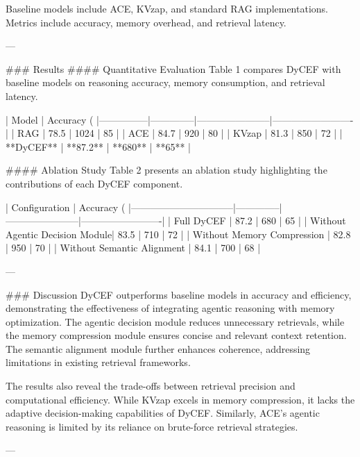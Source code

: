 Baseline models include ACE, KVzap, and standard RAG implementations. Metrics include accuracy, memory overhead, and retrieval latency.

---

### Results
#### Quantitative Evaluation
Table 1 compares DyCEF with baseline models on reasoning accuracy, memory consumption, and retrieval latency.

| Model         | Accuracy (%
|---------------|--------------|-----------------------|-------------------------|
| RAG           | 78.5         | 1024                 | 85                      |
| ACE           | 84.7         | 920                  | 80                      |
| KVzap         | 81.3         | 850                  | 72                      |
| **DyCEF**     | **87.2**     | **680**              | **65**                  |

#### Ablation Study
Table 2 presents an ablation study highlighting the contributions of each DyCEF component.

| Configuration                  | Accuracy (%
|--------------------------------|--------------|-----------------------|-------------------------|
| Full DyCEF                     | 87.2         | 680                   | 65                      |
| Without Agentic Decision Module| 83.5         | 710                   | 72                      |
| Without Memory Compression     | 82.8         | 950                   | 70                      |
| Without Semantic Alignment     | 84.1         | 700                   | 68                      |

---

### Discussion
DyCEF outperforms baseline models in accuracy and efficiency, demonstrating the effectiveness of integrating agentic reasoning with memory optimization. The agentic decision module reduces unnecessary retrievals, while the memory compression module ensures concise and relevant context retention. The semantic alignment module further enhances coherence, addressing limitations in existing retrieval frameworks.

The results also reveal the trade-offs between retrieval precision and computational efficiency. While KVzap excels in memory compression, it lacks the adaptive decision-making capabilities of DyCEF. Similarly, ACE's agentic reasoning is limited by its reliance on brute-force retrieval strategies.

---

